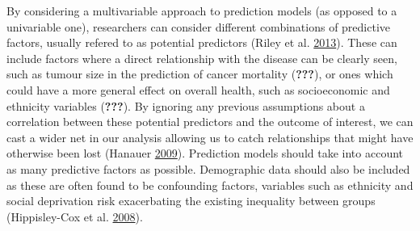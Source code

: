 \documentclass[
]{article}
\begin{document}
By considering a multivariable approach to prediction models (as opposed to a univariable one), researchers can consider different combinations of predictive factors, usually refered to as potential predictors (Riley et al. \protect\hyperlink{ref-riley_prognosis_2013}{2013}). These can include factors where a direct relationship with the disease can be clearly seen, such as tumour size in the prediction of cancer mortality ({\textbf{???}}), or ones which could have a more general effect on overall health, such as socioeconomic and ethnicity variables ({\textbf{???}}). By ignoring any previous assumptions about a correlation between these potential predictors and the outcome of interest, we can cast a wider net in our analysis allowing us to catch relationships that might have otherwise been lost (Hanauer \protect\hyperlink{ref-hanauer_exploring_2009}{2009}). Prediction models should take into account as many predictive factors as possible. Demographic data should also be included as these are often found to be confounding factors, variables such as ethnicity and social deprivation risk exacerbating the existing inequality between groups (Hippisley-Cox et al. \protect\hyperlink{ref-hippisley-cox_predicting_2008}{2008}).
\end{document}
